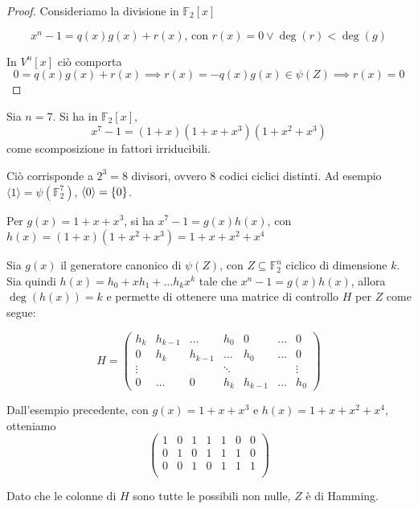 \begin{proof}
  Consideriamo la divisione in \(\mathbb{F}_2[x]\)

  \[x^n - 1 = q(x)g(x) + r(x) \text{, con } r(x) = 0 \lor \deg(r) < \deg(g)\]

  In \(V^n[x]\) ciò comporta
  \[0 = q(x)g(x) +r(x) \implies r(x) = -q(x)g(x)\in \psi(Z) \implies r(x) = 0\]
\end{proof}

\begin{example}{}
  Sia \(n=7\). Si ha in \(\mathbb{F}_2[x]\),
  \[x^7-1=(1+x)(1+x+x^3)(1+x^2+x^3)\]
  come scomposizione in fattori irriducibili.

  Ciò corrisponde a \(2^3 = 8\) divisori, ovvero \(8\) codici ciclici distinti.
  Ad esempio \(\langle 1 \rangle = \psi(\mathbb{F}_2^7)\), \(\langle 0 \rangle = \set{0}\).

  Per \(g(x) = 1+x+x^3\), si ha \(x^7-1 = g(x)h(x)\), con \(h(x) = (1+x)(1+x^2+x^3)=1+x+x^2+x^4\)
\end{example}

\begin{theorem}{}
  Sia \(g(x)\) il generatore canonico di \(\psi(Z)\), con \(Z \subseteq \mathbb{F}_2^n\) ciclico di dimensione \(k\).
  Sia quindi \(h(x) = h_0+xh_1+\ldots h_k x^k\) tale che \(x^n-1=g(x)h(x)\), allora \(\deg(h(x)) = k\) e permette di ottenere una matrice di controllo \(H\) per \(Z\) come segue:

  \[H=\begin{pmatrix}
    h_k     & h_{k-1} & \ldots  & h_0     & 0   & \ldots & 0 \\
    0       & h_k     & h_{k-1} & \ldots  & h_0 & \ldots & 0 \\
    \vdots  &         &         & \ddots  &     &        & \vdots \\
    0       & \ldots  & 0       & h_k     & h_{k-1} & \ldots & h_0
  \end{pmatrix}\]
\end{theorem}

\begin{example}{}
  Dall'esempio precedente, con \(g(x) = 1+x+x^3\) e \(h(x) = 1+x+x^2+x^4\), otteniamo
  \[\begin{pmatrix}
    1 & 0 & 1 & 1 & 1 & 0 & 0 \\
    0 & 1 & 0 & 1 & 1 & 1 & 0 \\
    0 & 0 & 1 & 0 & 1 & 1 & 1 \\
  \end{pmatrix}\]

  Dato che le colonne di \(H\) sono tutte le possibili non nulle, \(Z\) è di Hamming.
\end{example}

